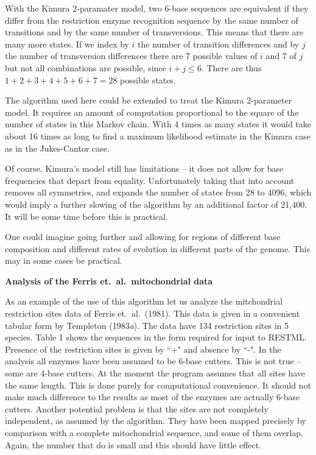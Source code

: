 With the Kimura 2-paramater model, two 6-base sequences are equivalent if
they differ from the restriction enzyme recognition sequence by the same
number of transitions and by the same number of transversions.  This means that
there are many more states.  If we index by $i$ the number of transition
differences and by $j$ the number of transversion differences there are
7 possible values of $i$ and 7 of $j$ but not all combinations are
possible, since $i+j \le 6$.  There are thus $1 + 2 + 3 + 4 + 5 + 6 + 7 = 28$
possible states.  

The algorithm used here could be extended to treat the Kimura 2-parameter
model.  It requires an amount of computation proportional to the
square of the number of states in this Markov chain.   With 4 times
as many states it would take about 16 times as long to find a maximum
likelihood estimate in the Kimura case as in the Jukes-Cantor case.

Of course, Kimura's model still has limitations -- it does not allow for
base frequencies that depart from equality.  Unfortunately taking that
into account removes all symmetries, and expands the number of states
from 28 to 4096, which would imply a further slowing of the algorithm
by an additional factor of 21,400.  It will be some time before this is
practical.

One could imagine going further and allowing for regions of different
base composition and different rates of evolution in different parts of
the genome.  This may in some cases be practical.
\bigskip

\centerline{\bf Analysis of the Ferris et.~al.~mitochondrial data}

As an example of the use of this algorithm let us analyze the mitchondrial
restriction sites data of Ferris et.~al.~(1981).  This data is
given in a convenient tabular form by Templeton (1983{\it a}).  The data have
134 restriction sites in 5 species.  Table 1 shows the
sequences in the form required for input to RESTML. Presence of the
restriction sites is given by ``+" and absence by ``-".  In the analysis
all enzymes have been assumed to be 6-base cutters.  This is not true --
some are 4-base cutters.  At the moment the program assumes that all
sites have the same length.  This is done purely for computational
convenience.  It should not make much difference to the results as most
of the enzymes are actually 6-base cutters.  Another potential problem is
that the sites are not completely independent, as assumed by the algorithm.
They have been mapped precisely by comparison with a complete mitochondrial
sequence, and some of them overlap.  Again, the number that do is small
and this should have little effect.

